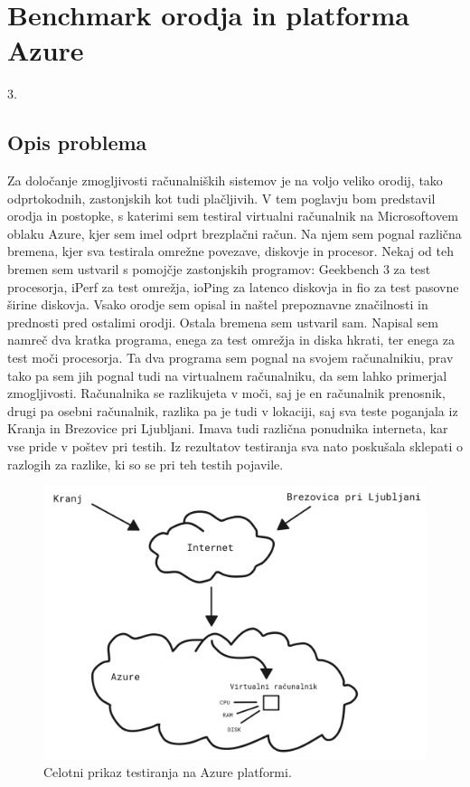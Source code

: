 \chapter{Benchmark orodja in platforma Azure}

\pagestyle{fancy}
\fancyhf{}
\fancyhead[LE,RO]{\thepage}
\fancyhead[RE,LO]{\leftmark}

\huge 3.

\normalsize
\bigskip

\section{Opis problema}
Za določanje zmogljivosti računalniških sistemov je na voljo veliko orodij, tako odprtokodnih, zastonjskih kot tudi plačljivih. V tem poglavju bom predstavil orodja in postopke, s katerimi sem testiral virtualni računalnik na Microsoftovem oblaku Azure, kjer sem imel odprt brezplačni račun. Na njem sem pognal različna bremena, kjer sva testirala omrežne povezave, diskovje in procesor. Nekaj od teh bremen sem ustvaril s pomojčje zastonjskih programov: Geekbench 3 za test procesorja, iPerf za test omrežja, ioPing za latenco diskovja in fio za test pasovne širine diskovja. Vsako orodje sem opisal in naštel prepoznavne značilnosti in prednosti pred ostalimi orodji. Ostala bremena sem ustvaril sam. Napisal sem namreč dva kratka programa, enega za test omrežja in diska hkrati, ter enega za test moči procesorja. Ta dva programa sem pognal na svojem računalnikiu, prav tako pa sem jih pognal tudi na virtualnem računalniku, da sem lahko primerjal zmogljivosti. Računalnika se razlikujeta v moči, saj je en računalnik prenosnik, drugi pa osebni računalnik, razlika pa je tudi v lokaciji, saj sva teste poganjala iz Kranja in Brezovice pri Ljubljani. Imava tudi različna ponudnika interneta, kar vse pride v poštev pri testih. Iz rezultatov testiranja sva nato poskušala sklepati o razlogih za razlike, ki so se pri teh testih pojavile.
  
\begin{figure}[H]
	\centering
	\includegraphics[scale=0.15]{Img/celotni_diagram.png}
	\caption{Celotni prikaz testiranja na Azure platformi.}
	\label{fig:7_breme2}
\end{figure}

